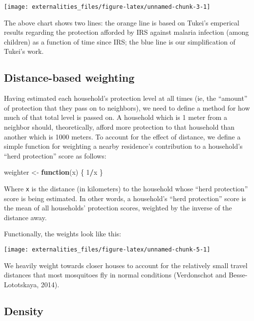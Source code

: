 \documentclass[]{article}
\newenvironment{Shaded}{\begin{snugshade}}{\end{snugshade}}
\newcommand{\DecValTok}[1]{\textcolor[rgb]{0.00,0.00,0.81}{#1}}
\newcommand{\StringTok}[1]{\textcolor[rgb]{0.31,0.60,0.02}{#1}}
\newcommand{\ControlFlowTok}[1]{\textcolor[rgb]{0.13,0.29,0.53}{\textbf{#1}}}
\newcommand{\OperatorTok}[1]{\textcolor[rgb]{0.81,0.36,0.00}{\textbf{#1}}}
\newcommand{\NormalTok}[1]{#1}
\begin{document}
\begin{center}\texttt{[image: externalities\_files/figure-latex/unnamed-chunk-3-1]} \end{center}

The above chart shows two lines: the orange line is based on Tukei's
emperical results regarding the protection afforded by IRS against
malaria infection (among children) as a function of time since IRS; the
blue line is our simplification of Tukei's work.

\subsection{Distance-based weighting}\label{distance-based-weighting}

Having estimated each household's protection level at all times (ie, the
``amount'' of protection that they pass on to neighbors), we need to
define a method for how much of that total level is passed on. A
household which is 1 meter from a neighbor should, theoretically, afford
more protection to that household than another which is 1000 meters. To
account for the effect of distance, we define a simple function for
weighting a nearby residence's contribution to a household's ``herd
protection'' score as follows:

\begin{Shaded}
\begin{Highlighting}[]
\NormalTok{weighter <-}\StringTok{ }\ControlFlowTok{function}\NormalTok{(x) \{}
    \DecValTok{1}\OperatorTok{/}\NormalTok{x}
\NormalTok{\}}
\end{Highlighting}
\end{Shaded}

Where \texttt{x} is the distance (in kilometers) to the household whose
``herd protection'' score is being estimated. In other words, a
household's ``herd protection'' score is the mean of all households'
protection scores, weighted by the inverse of the distance away.

Functionally, the weights look like this:

\begin{center}\texttt{[image: externalities\_files/figure-latex/unnamed-chunk-5-1]} \end{center}

We heavily weight towards closer houses to account for the relatively
small travel distances that most mosquitoes fly in normal conditions
(Verdonschot and Besse-Lototskaya, 2014).

\subsection{Density}\label{density}
\end{document}
